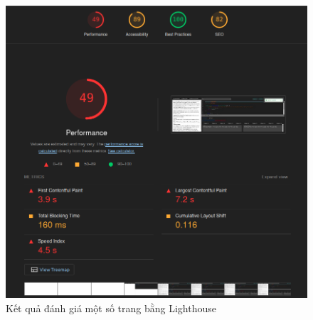 \begin{figure}[H]
\vspace{1em}

\begin{minipage}{0.45\textwidth}
  \centering
  \includegraphics[width=\linewidth]{images/lighthouse_code_ex_page_eval.png}
\end{minipage}

\caption{Kết quả đánh giá một số trang bằng Lighthouse}
\end{figure}
